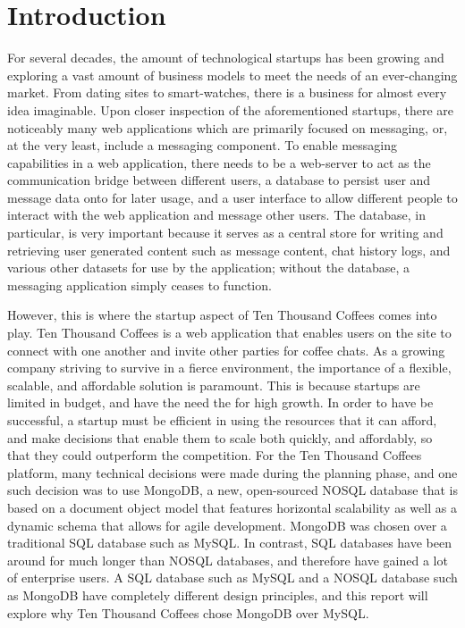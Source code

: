 \documentclass[12pt]{article}
\begin{document}
\newpage


\toc
\lof
\lot


\section{Introduction}
For several decades, the amount of technological startups has been growing and exploring a vast amount of business models to meet the needs of an ever-changing market. From dating sites to smart-watches, there is a business for almost every idea imaginable. Upon closer inspection of the aforementioned startups, there are noticeably many web applications which are primarily focused on messaging, or, at the very least, include a messaging component. To enable messaging capabilities in a web application, there needs to be a web-server to act as the communication bridge between different users, a database to persist user and message data onto for later usage, and a user interface to allow different people to interact with the web application and message other users. The database, in particular, is very important because it serves as a central store for writing and retrieving user generated content such as message content, chat history logs, and various other datasets for use by the application; without the database, a messaging application simply ceases to function.

However, this is where the startup aspect of Ten Thousand Coffees comes into play. Ten Thousand Coffees is a web application that enables users on the site to connect with one another and invite other parties for coffee chats. As a growing company striving to survive in a fierce environment, the importance of a flexible, scalable, and affordable solution is paramount. This is because startups are limited in budget, and have the need the for high growth. In order to have be successful, a startup must be efficient in using the resources that it can afford, and make decisions that enable them to scale both quickly, and affordably, so that they could outperform the competition. For the Ten Thousand Coffees platform, many technical decisions were made during the planning phase, and one such decision was to use MongoDB, a new, open-sourced NOSQL database that is based on a document object model that features horizontal scalability as well as a dynamic schema that allows for agile development. MongoDB was chosen over a traditional SQL database such as MySQL. In contrast, SQL databases have been around for much longer than NOSQL databases, and therefore have gained a lot of enterprise users. A SQL database such as MySQL and a NOSQL database such as MongoDB have completely different design principles, and this report will explore why Ten Thousand Coffees chose MongoDB over MySQL.
\end{document}
